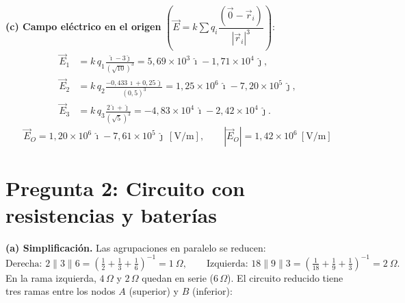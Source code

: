 \documentclass[12pt,letterpaper]{article}
\begin{document}
\medskip
\noindent\textbf{(c) Campo el\'ectrico en el origen}
$\left(\vec E=k\sum q_i\dfrac{(\vec 0-\vec r_i)}{|\vec r_i|^3}\right)$:
\begin{align*}
    \vec E_1 &= k\,q_1\frac{\hat\imath-3\hat\jmath}{(\sqrt{10})^3} = 5{,}69\times10^{3}\,\hat\imath - 1{,}71\times10^{4}\,\hat\jmath,\\[2pt]
    \vec E_2 &= k\,q_2\frac{-0{,}433\,\hat\imath+0{,}25\,\hat\jmath}{(0{,}5)^3} = 1{,}25\times10^{6}\,\hat\imath - 7{,}20\times10^{5}\,\hat\jmath,\\[2pt]
    \vec E_3 &= k\,q_3\frac{2\hat\imath+\hat\jmath}{(\sqrt{5})^3} = -4{,}83\times10^{4}\,\hat\imath - 2{,}42\times10^{4}\,\hat\jmath.
\end{align*}
\[
    \boxed{\vec E_O = 1{,}20\times10^{6}\,\hat\imath - 7{,}61\times10^{5}\,\hat\jmath\ [\text{V/m}],\qquad
    |\vec E_O| = 1{,}42\times10^{6}\ [\text{V/m}]}
\]

\newpage

\section*{Pregunta 2: Circuito con resistencias y bater\'ias}

\noindent\textbf{(a) Simplificaci\'on.} Las agrupaciones en paralelo se reducen:
\[
    \text{Derecha: } 2\parallel3\parallel6 = \left(\tfrac12+\tfrac13+\tfrac16\right)^{-1} = 1\ \Omega,
    \qquad
    \text{Izquierda: } 18\parallel9\parallel3 = \left(\tfrac1{18}+\tfrac19+\tfrac13\right)^{-1} = 2\ \Omega.
\]
En la rama izquierda, $4\,\Omega$ y $2\,\Omega$ quedan en serie ($6\,\Omega$). El circuito reducido tiene
tres ramas entre los nodos $A$ (superior) y $B$ (inferior):
\end{document}
